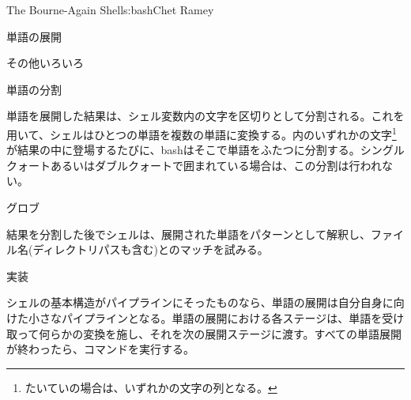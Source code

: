 \begin{aosachapter}{The Bourne-Again Shell}{s:bash}{Chet Ramey}
\begin{aosasect1}{単語の展開}
\begin{aosasect2}{その他いろいろ}
\end{aosasect2}

\begin{aosasect2}{単語の分割}

単語を展開した結果は、シェル変数内の文字を区切りとして分割される。これを用いて、シェルはひとつの単語を複数の単語に変換する。内のいずれかの文字\footnote{たいていの場合は、いずれかの文字の列となる。}が結果の中に登場するたびに、bashはそこで単語をふたつに分割する。シングルクォートあるいはダブルクォートで囲まれている場合は、この分割は行われない。

\end{aosasect2}

\begin{aosasect2}{グロブ}

結果を分割した後でシェルは、展開された単語をパターンとして解釈し、ファイル名(ディレクトリパスも含む)とのマッチを試みる。

\end{aosasect2}

\begin{aosasect2}{実装}

シェルの基本構造がパイプラインにそったものなら、単語の展開は自分自身に向けた小さなパイプラインとなる。単語の展開における各ステージは、単語を受け取って何らかの変換を施し、それを次の展開ステージに渡す。すべての単語展開が終わったら、コマンドを実行する。


\end{aosasect2}
\end{aosasect1}
\end{aosachapter}
